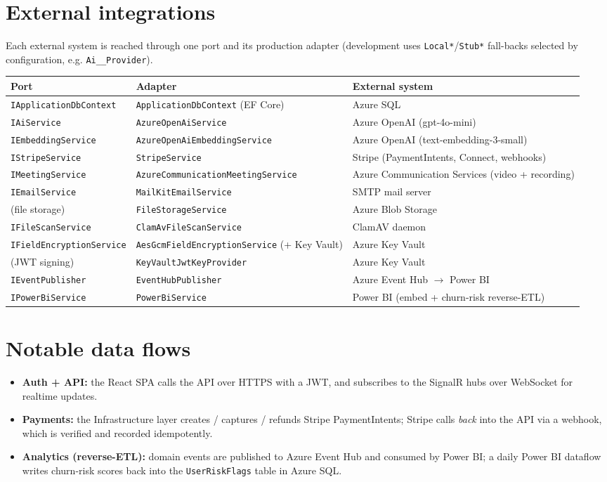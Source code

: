\documentclass[11pt,a4paper]{article}
\begin{document}
\section{External integrations}
Each external system is reached through one port and its production adapter
(development uses \texttt{Local*}/\texttt{Stub*} fall-backs selected by configuration,
e.g. \texttt{Ai\_\_Provider}).
\begin{longtable}{@{}p{3.6cm}p{4.7cm}p{5.6cm}@{}}
\toprule
\textbf{Port} & \textbf{Adapter} & \textbf{External system}\\
\midrule\endhead
\texttt{IApplicationDbContext} & \texttt{ApplicationDbContext} (EF Core) & Azure SQL\\
\texttt{IAiService} & \texttt{AzureOpenAiService} & Azure OpenAI (gpt-4o-mini)\\
\texttt{IEmbeddingService} & \texttt{AzureOpenAiEmbeddingService} & Azure OpenAI (text-embedding-3-small)\\
\texttt{IStripeService} & \texttt{StripeService} & Stripe (PaymentIntents, Connect, webhooks)\\
\texttt{IMeetingService} & \texttt{AzureCommunicationMeetingService} & Azure Communication Services (video + recording)\\
\texttt{IEmailService} & \texttt{MailKitEmailService} & SMTP mail server\\
(file storage) & \texttt{FileStorageService} & Azure Blob Storage\\
\texttt{IFileScanService} & \texttt{ClamAvFileScanService} & ClamAV daemon\\
\texttt{IFieldEncryptionService} & \texttt{AesGcmFieldEncryptionService} (+ Key Vault) & Azure Key Vault\\
(JWT signing) & \texttt{KeyVaultJwtKeyProvider} & Azure Key Vault\\
\texttt{IEventPublisher} & \texttt{EventHubPublisher} & Azure Event Hub $\rightarrow$ Power BI\\
\texttt{IPowerBiService} & \texttt{PowerBiService} & Power BI (embed + churn-risk reverse-ETL)\\
\bottomrule
\end{longtable}

\section{Notable data flows}
\begin{itemize}
  \item \textbf{Auth + API:} the React SPA calls the API over HTTPS with a JWT,
        and subscribes to the SignalR hubs over WebSocket for realtime updates.
  \item \textbf{Payments:} the Infrastructure layer creates / captures / refunds
        Stripe PaymentIntents; Stripe calls \emph{back} into the API via a webhook,
        which is verified and recorded idempotently.
  \item \textbf{Analytics (reverse-ETL):} domain events are published to Azure
        Event Hub and consumed by Power BI; a daily Power BI dataflow writes
        churn-risk scores back into the \texttt{UserRiskFlags} table in Azure SQL.
\end{itemize}
\end{document}

